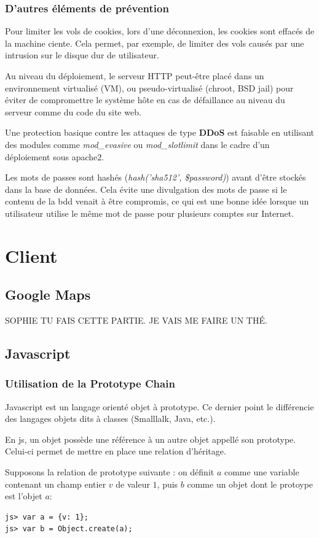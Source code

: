 \documentclass[a4paper]{article}
\begin{document}
\subsubsection{D'autres éléments de prévention}

Pour limiter les vols de cookies, lors d'une déconnexion, les cookies sont
effacés de la machine ciente. Cela permet, par exemple, de limiter des vols
causés par une intrusion sur le disque dur de utilisateur.

Au niveau du déploiement, le serveur HTTP peut-être placé dans un environnement
virtualisé (VM), ou pseudo-virtualisé (chroot, BSD jail) pour éviter de compromettre
le système hôte en cas de défaillance au niveau du serveur comme du code du site
web.

Une protection basique contre les attaques de type \textbf{DDoS} est faisable en
utilisant des modules comme \textit{mod\_evasive} ou \textit{mod\_slotlimit} dans
le cadre d'un déploiement sous apache$2$.

Les mots de passes sont hashés (\textit{hash('sha512', \$password)}) avant d'être
stockés dans la base de données. Cela évite une divulgation des mots de passe si
le contenu de la bdd venait à être compromis, ce qui est une bonne idée lorsque
un utilisateur utilise le même mot de passe pour plusieurs comptes sur Internet.

\section{Client}
\subsection{Google Maps}
SOPHIE TU FAIS CETTE PARTIE. JE VAIS ME FAIRE UN THÉ.
\subsection{Javascript}
\subsubsection{Utilisation de la Prototype Chain}
Javascript est un langage orienté objet à prototype. Ce dernier point
le différencie des langages objets dits à classes (Smalllalk, Java, etc.).

En js, un objet possède une référence à un autre objet appellé son prototype.
Celui-ci permet de mettre en place une relation d'héritage.

Supposons la relation de prototype suivante : on définit $a$ comme une variable
contenant un champ entier $v$ de valeur $1$, puis $b$ comme un objet dont
le protoype est l'objet $a$:
\begin{verbatim}
js> var a = {v: 1};
js> var b = Object.create(a);
\end{verbatim}
\end{document}
